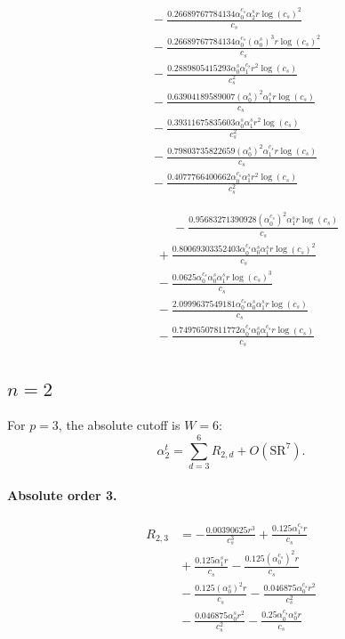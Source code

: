 \documentclass[10pt]{article}
\begin{document}
\begin{align*}
&{}  - \frac{0.26689767784134 \alpha_{0}^{c_s} \alpha_{2}^s r \log{\left(c_{s} \right)}^{2}}{c_{s}} \\
&{}  - \frac{0.26689767784134 \alpha_{0}^{c_s} \left(\alpha_{0}^s\right)^{3} r \log{\left(c_{s} \right)}^{2}}{c_{s}} \\
&{}  - \frac{0.2889805415293 \alpha_{0}^s \alpha_{1}^{c_s} r^{2} \log{\left(c_{s} \right)}}{c_{s}^{2}} \\
&{}  - \frac{0.63904189589007 \left(\alpha_{0}^s\right)^{2} \alpha_{1}^s r \log{\left(c_{s} \right)}}{c_{s}} \\
&{}  - \frac{0.39311675835603 \alpha_{0}^s \alpha_{1}^s r^{2} \log{\left(c_{s} \right)}}{c_{s}^{2}} \\
&{}  - \frac{0.79803735822659 \left(\alpha_{0}^s\right)^{2} \alpha_{1}^{c_s} r \log{\left(c_{s} \right)}}{c_{s}} \\
&{}  - \frac{0.4077766400662 \alpha_{0}^{c_s} \alpha_{1}^s r^{2} \log{\left(c_{s} \right)}}{c_{s}^{2}}
\end{align*}

\begin{align*}
\phantom{R_{1,5}} &\phantom{={}}{}  - \frac{0.95683271390928 \left(\alpha_{0}^{c_s}\right)^{2} \alpha_{1}^s r \log{\left(c_{s} \right)}}{c_{s}} \\
&{}  + \frac{0.80069303352403 \alpha_{0}^{c_s} \alpha_{0}^s \alpha_{1}^s r \log{\left(c_{s} \right)}^{2}}{c_{s}} \\
&{}  - \frac{0.0625 \alpha_{0}^{c_s} \alpha_{0}^s \alpha_{1}^s r \log{\left(c_{s} \right)}^{3}}{c_{s}} \\
&{}  - \frac{2.0999637549181 \alpha_{0}^{c_s} \alpha_{0}^s \alpha_{1}^s r \log{\left(c_{s} \right)}}{c_{s}} \\
&{}  - \frac{0.74976507811772 \alpha_{0}^{c_s} \alpha_{0}^s \alpha_{1}^{c_s} r \log{\left(c_{s} \right)}}{c_{s}}
\end{align*}

\subsection{$n=2$}
For $p=3$, the absolute cutoff is $W=6$:
\[\alpha_{2}^t=\sum_{d=3}^{6}R_{2,d}+O(\mathrm{SR}^{7}).\]
\paragraph{Absolute order 3.}
\begin{align*}
R_{2,3} &=  - \frac{0.00390625 r^{3}}{c_{s}^{3}} + \frac{0.125 \alpha_{1}^{c_s} r}{c_{s}} \\
&{}  + \frac{0.125 \alpha_{1}^s r}{c_{s}} - \frac{0.125 \left(\alpha_{0}^{c_s}\right)^{2} r}{c_{s}} \\
&{}  - \frac{0.125 \left(\alpha_{0}^s\right)^{2} r}{c_{s}} - \frac{0.046875 \alpha_{0}^{c_s} r^{2}}{c_{s}^{2}} \\
&{}  - \frac{0.046875 \alpha_{0}^s r^{2}}{c_{s}^{2}} - \frac{0.25 \alpha_{0}^{c_s} \alpha_{0}^s r}{c_{s}}
\end{align*}
\end{document}
